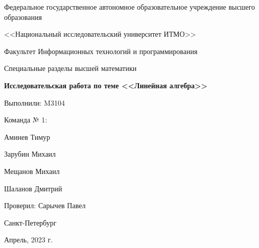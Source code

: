 \begin{titlepage}
  \begin{center}
    \Large
    Федеральное государственное автономное образовательное учреждение
    высшего образования

    <<Национальный исследовательский университет ИТМО>>

    \vspace{1cm}

    \Large
    Факультет Информационных технологий и программирования

    \vspace{1cm}
    Специальные разделы высшей математики

    \vspace{0.5cm}
    \LARGE
    \textbf{Исследовательская работа по теме
      <<Линейная алгебра>>
    }
  \end{center}

  \vspace{4cm}
  \vfill

  \begin{flushright}
    \Large
    Выполнили: M3104

    Команда № 1:

    Аминев Тимур

    Зарубин Михаил

    Мещанов Михаил

    Шаланов Дмитрий


    Проверил: Сарычев Павел
  \end{flushright}

  \vfill

  \begin{center}
    \Large
    Санкт-Петербург

    Апрель, 2023 г.
  \end{center}
\end{titlepage}
